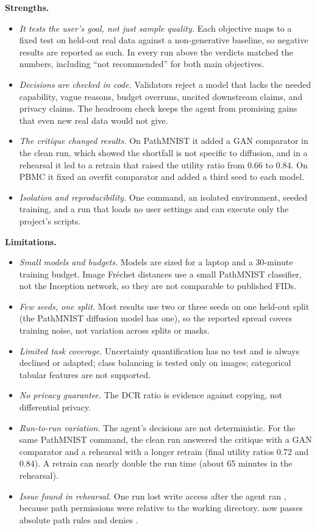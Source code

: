 \documentclass[10pt]{article}
\newcommand{\code}[1]{\texttt{\detokenize{#1}}}
\begin{document}
\textbf{Strengths.}
\begin{itemize}
\item \emph{It tests the user's goal, not just sample quality.} Each objective maps to a fixed test on held-out real
  data against a non-generative baseline, so negative results are reported as such. In every run above the verdicts
  matched the numbers, including ``not recommended'' for both main objectives.
\item \emph{Decisions are checked in code.} Validators reject a model that lacks the needed capability, vague reasons,
  budget overruns, uncited downstream claims, and privacy claims. The headroom check keeps the agent from promising
  gains that even new real data would not give.
\item \emph{The critique changed results.} On PathMNIST it added a GAN comparator in the clean run, which showed the
  shortfall is not specific to diffusion, and in a rehearsal it led to a retrain that raised the utility ratio from 0.66
  to 0.84. On PBMC it fixed an overfit comparator and added a third seed to each model.
\item \emph{Isolation and reproducibility.} One command, an isolated environment, seeded training, and a run that loads
  no user settings and can execute only the project's scripts.
\end{itemize}

\textbf{Limitations.}
\begin{itemize}
\item \emph{Small models and budgets.} Models are sized for a laptop and a 30-minute training budget. Image Fr\'echet
  distances use a small PathMNIST classifier, not the Inception network, so they are not comparable to published FIDs.
\item \emph{Few seeds, one split.} Most results use two or three seeds on one held-out split (the PathMNIST diffusion
  model has one), so the reported spread covers training noise, not variation across splits or masks.
\item \emph{Limited task coverage.} Uncertainty quantification has no test and is always declined or adapted; class
  balancing is tested only on images; categorical tabular features are not supported.
\item \emph{No privacy guarantee.} The DCR ratio is evidence against copying, not differential privacy.
\item \emph{Run-to-run variation.} The agent's decisions are not deterministic. For the same PathMNIST command, the clean
  run answered the critique with a GAN comparator and a rehearsal with a longer retrain (final utility ratios 0.72 and
  0.84). A retrain can nearly double the run time (about 65 minutes in the rehearsal).
\item \emph{Issue found in rehearsal.} One run lost write access after the agent ran \code{cd}, because path permissions
  were relative to the working directory. \code{run.sh} now passes absolute path rules and denies \code{cd}.
\end{itemize}
\end{document}
